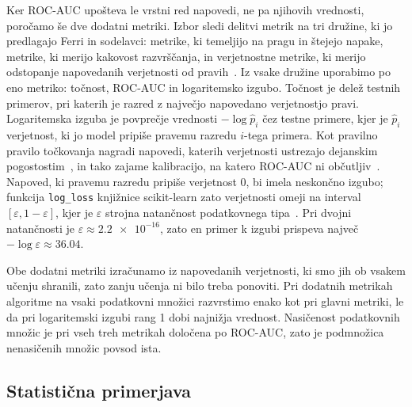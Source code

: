 \documentclass[a4paper,12pt,openright]{book}
\begin{document}
Ker ROC-AUC upošteva le vrstni red napovedi, ne pa njihovih vrednosti, poročamo
še dve dodatni metriki. Izbor sledi delitvi metrik na tri družine, ki jo
predlagajo Ferri in sodelavci: metrike, ki temeljijo na pragu in štejejo
napake, metrike, ki merijo kakovost razvrščanja, in verjetnostne metrike, ki
merijo odstopanje napovedanih verjetnosti od pravih~\cite{ferri2009experimental}.
Iz vsake družine uporabimo po eno metriko: točnost, ROC-AUC in logaritemsko
izgubo. Točnost je delež testnih primerov, pri katerih je razred z največjo
napovedano verjetnostjo pravi. Logaritemska izguba je povprečje vrednosti
$-\log \hat{p}_i$ čez testne primere, kjer je $\hat{p}_i$ verjetnost, ki jo
model pripiše pravemu razredu $i$-tega primera. Kot pravilno pravilo
točkovanja nagradi napovedi, katerih verjetnosti ustrezajo dejanskim
pogostostim~\cite{gneiting2007strictly}, in tako zajame kalibracijo, na katero
ROC-AUC ni občutljiv~\cite{gijsbers2024amlb}. Napoved, ki pravemu razredu
pripiše verjetnost 0, bi imela neskončno izgubo; funkcija \texttt{log\_loss}
knjižnice scikit-learn zato verjetnosti omeji na interval $[\varepsilon, 1 -
\varepsilon]$, kjer je $\varepsilon$ strojna natančnost podatkovnega
tipa~\cite{sklearndocslogloss}. Pri dvojni natančnosti je $\varepsilon \approx
\num{2.2e-16}$, zato en primer k izgubi prispeva največ $-\log \varepsilon
\approx \num{36.04}$.

Obe dodatni metriki izračunamo iz napovedanih verjetnosti, ki smo jih ob
vsakem učenju shranili, zato zanju učenja ni bilo treba ponoviti. Pri
dodatnih metrikah algoritme na vsaki podatkovni množici razvrstimo enako kot
pri glavni metriki, le da pri logaritemski izgubi rang 1 dobi najnižja
vrednost. Nasičenost podatkovnih množic je pri vseh treh metrikah določena po
ROC-AUC, zato je podmnožica nenasičenih množic povsod ista.

\subsection{Statistična primerjava}
\label{sec:statistika}
\end{document}

